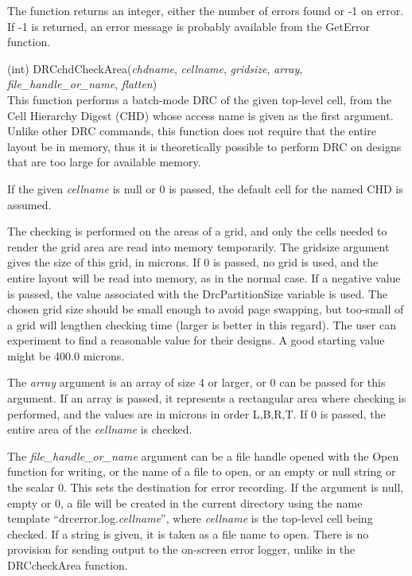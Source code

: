 \begin{description}
The function returns an integer, either the number of errors found or
-1 on error.  If -1 is returned, an error message is probably
available from the {\vt GetError} function.

\item{(int) \vt DRCchdCheckArea({\it chdname\/}, {\it cellname\/},
  {\it gridsize\/}, {\it array\/}, {\it file\_handle\_or\_name\/},
  {\it flatten})}\\
This function performs a batch-mode DRC of the given top-level cell,
from the Cell Hierarchy Digest (CHD) whose access name is given as the
first argument.  Unlike other DRC commands, this function does not
require that the entire layout be in memory, thus it is theoretically
possible to perform DRC on designs that are too large for available
memory. 

If the given {\it cellname} is null or 0 is passed, the default cell
for the named CHD is assumed.

The checking is performed on the areas of a grid, and only the cells
needed to render the grid area are read into memory temporarily.  The
gridsize argument gives the size of this grid, in microns.  If 0 is
passed, no grid is used, and the entire layout will be read into
memory, as in the normal case.  If a negative value is passed, the
value associated with the {\et DrcPartitionSize} variable is used. 
The chosen grid size should be small enough to avoid page swapping,
but too-small of a grid will lengthen checking time (larger is better
in this regard).  The user can experiment to find a reasonable value
for their designs.  A good starting value might be 400.0 microns.

The {\it array} argument is an array of size 4 or larger, or 0 can be
passed for this argument.  If an array is passed, it represents a
rectangular area where checking is performed, and the values are in
microns in order L,B,R,T.  If 0 is passed, the entire area of the {\it
cellname} is checked.

The {\it file\_handle\_or\_name} argument can be a file handle opened
with the {\vt Open} function for writing, or the name of a file to
open, or an empty or null string or the scalar 0.  This sets the
destination for error recording.  If the argument is null, empty or 0,
a file will be created in the current directory using the name
template ``{\vt drcerror.log.}{\it cellname}'', where {\it cellname}
is the top-level cell being checked.  If a string is given, it is
taken as a file name to open.  There is no provision for sending
output to the on-screen error logger, unlike in the {\vt DRCcheckArea}
function.


\end{description}
